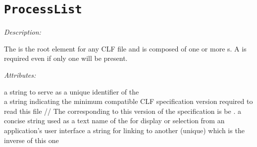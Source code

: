 \section{\texttt{ProcessList}}
\label{sec:processList}

\emph{Description:} \par
The  is the root element for any CLF file and is composed of one or more s.  A  is required even if only one  will be present.  



\emph{Attributes:}
\begin{xmlfields}
	\xmlitem[id][required] a string to serve as a unique identifier of the \\
	\xmlitem[compCLFversion][required] a string indicating the minimum compatible CLF specification version required to read this file //
	The  corresponding to this version of the specification is be .   \xmlitem[name][optional] a concise string used as a text name of the  for display or selection from an application's user interface
	\xmlitem[inverseOf][optional] a string for linking to another   (unique) which is the inverse of this one
\end{xmlfields}

